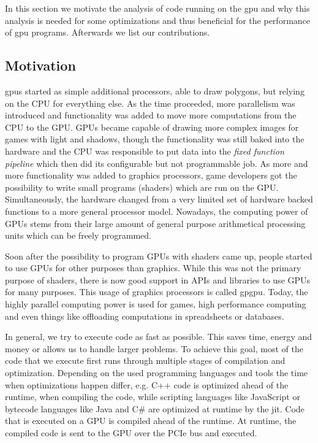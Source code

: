 {}
In this section we motivate the analysis of code running on the \gls{gpu} and why this analysis is needed for some optimizations and thus beneficial for the performance of \gls{gpu} programs. Afterwards we list our contributions.

\subsection{Motivation}
\label{sub:motivation}
\Glspl{gpu} started as simple additional processors, able to draw polygons, but relying on the CPU for everything else. As the time proceeded, more parallelism was introduced and functionality was added to move more computations from the CPU to the GPU. GPUs became capable of drawing more complex images for games with light and shadows, though the functionality was still baked into the hardware and the CPU was responsible to put data into the \emph{fixed function pipeline} which then did its configurable but not programmable job.
As more and more functionality was added to graphics processors, game developers got the possibility to write small programs (shaders) which are run on the GPU. Simultaneously, the hardware changed from a very limited set of hardware backed functions to a more general processor model. Nowadays, the computing power of GPUs stems from their large amount of general purpose arithmetical processing units which can be freely programmed.~\cite{McClanahan2010}

Soon after the possibility to program GPUs with shaders came up, people started to use GPUs for other purposes than graphics. While this was not the primary purpose of shaders, there is now good support in APIs and libraries to use GPUs for many purposes. This usage of graphics processors is called \gls{gpgpu}. Today, the highly parallel computing power is used for games, high performance computing and even things like offloading computations in spreadsheets or databases.~\cite{Lillqvist2016, Meraji2015}

In general, we try to execute code as fast as possible. This saves time, energy and money or allows us to handle larger problems. To achieve this goal, most of the code that we execute first runs through multiple stages of compilation and optimization. Depending on the used programming languages and tools the time when optimizations happen differ, e.g. C++ code is optimized ahead of the runtime, when compiling the code, while scripting languages like JavaScript or bytecode languages like Java and C# are optimized at runtime by the \gls{jit}. Code that is executed on a GPU is compiled ahead of the runtime. At runtime, the compiled code is sent to the GPU over the PCIe bus and executed.

